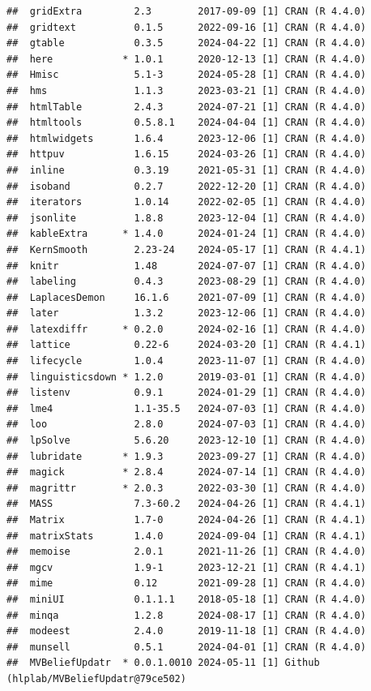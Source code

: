 \documentclass[
  11pt,
  man,mask,floatsintext]{apa6}
\begin{document}
\begin{verbatim}
##  gridExtra         2.3        2017-09-09 [1] CRAN (R 4.4.0)
##  gridtext          0.1.5      2022-09-16 [1] CRAN (R 4.4.0)
##  gtable            0.3.5      2024-04-22 [1] CRAN (R 4.4.0)
##  here            * 1.0.1      2020-12-13 [1] CRAN (R 4.4.0)
##  Hmisc             5.1-3      2024-05-28 [1] CRAN (R 4.4.0)
##  hms               1.1.3      2023-03-21 [1] CRAN (R 4.4.0)
##  htmlTable         2.4.3      2024-07-21 [1] CRAN (R 4.4.0)
##  htmltools         0.5.8.1    2024-04-04 [1] CRAN (R 4.4.0)
##  htmlwidgets       1.6.4      2023-12-06 [1] CRAN (R 4.4.0)
##  httpuv            1.6.15     2024-03-26 [1] CRAN (R 4.4.0)
##  inline            0.3.19     2021-05-31 [1] CRAN (R 4.4.0)
##  isoband           0.2.7      2022-12-20 [1] CRAN (R 4.4.0)
##  iterators         1.0.14     2022-02-05 [1] CRAN (R 4.4.0)
##  jsonlite          1.8.8      2023-12-04 [1] CRAN (R 4.4.0)
##  kableExtra      * 1.4.0      2024-01-24 [1] CRAN (R 4.4.0)
##  KernSmooth        2.23-24    2024-05-17 [1] CRAN (R 4.4.1)
##  knitr             1.48       2024-07-07 [1] CRAN (R 4.4.0)
##  labeling          0.4.3      2023-08-29 [1] CRAN (R 4.4.0)
##  LaplacesDemon     16.1.6     2021-07-09 [1] CRAN (R 4.4.0)
##  later             1.3.2      2023-12-06 [1] CRAN (R 4.4.0)
##  latexdiffr      * 0.2.0      2024-02-16 [1] CRAN (R 4.4.0)
##  lattice           0.22-6     2024-03-20 [1] CRAN (R 4.4.1)
##  lifecycle         1.0.4      2023-11-07 [1] CRAN (R 4.4.0)
##  linguisticsdown * 1.2.0      2019-03-01 [1] CRAN (R 4.4.0)
##  listenv           0.9.1      2024-01-29 [1] CRAN (R 4.4.0)
##  lme4              1.1-35.5   2024-07-03 [1] CRAN (R 4.4.0)
##  loo               2.8.0      2024-07-03 [1] CRAN (R 4.4.0)
##  lpSolve           5.6.20     2023-12-10 [1] CRAN (R 4.4.0)
##  lubridate       * 1.9.3      2023-09-27 [1] CRAN (R 4.4.0)
##  magick          * 2.8.4      2024-07-14 [1] CRAN (R 4.4.0)
##  magrittr        * 2.0.3      2022-03-30 [1] CRAN (R 4.4.0)
##  MASS              7.3-60.2   2024-04-26 [1] CRAN (R 4.4.1)
##  Matrix            1.7-0      2024-04-26 [1] CRAN (R 4.4.1)
##  matrixStats       1.4.0      2024-09-04 [1] CRAN (R 4.4.1)
##  memoise           2.0.1      2021-11-26 [1] CRAN (R 4.4.0)
##  mgcv              1.9-1      2023-12-21 [1] CRAN (R 4.4.1)
##  mime              0.12       2021-09-28 [1] CRAN (R 4.4.0)
##  miniUI            0.1.1.1    2018-05-18 [1] CRAN (R 4.4.0)
##  minqa             1.2.8      2024-08-17 [1] CRAN (R 4.4.0)
##  modeest           2.4.0      2019-11-18 [1] CRAN (R 4.4.0)
##  munsell           0.5.1      2024-04-01 [1] CRAN (R 4.4.0)
##  MVBeliefUpdatr  * 0.0.1.0010 2024-05-11 [1] Github (hlplab/MVBeliefUpdatr@79ce502)

\end{verbatim}
\end{document}
